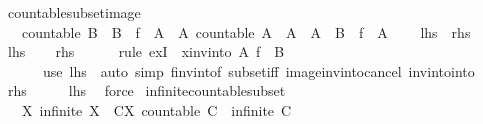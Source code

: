 \begin{isabellebody}
{\isafolddocument}%
%
\isadelimdocument
%
\endisadelimdocument
{}\isamarkupfalse%
\ countable{\isacharunderscore}subset{\isacharunderscore}image{\isacharcolon}\isanewline
\ \ \ {\isachardoublequoteopen}countable\ B\ {\isasymand}\ B\ {\isasymsubseteq}\ {\isacharparenleft}f\ {\isacharbackquote}\ A{\isacharparenright}\ {\isasymlongleftrightarrow}\ {\isacharparenleft}{\isasymexists}A{\isacharprime}{\isachardot}\ countable\ A{\isacharprime}\ {\isasymand}\ A{\isacharprime}\ {\isasymsubseteq}\ A\ {\isasymand}\ {\isacharparenleft}B\ {\isacharequal}\ f\ {\isacharbackquote}\ A{\isacharprime}{\isacharparenright}{\isacharparenright}{\isachardoublequoteclose}\isanewline
\ \ \ {\isacharparenleft}\ {\isachardoublequoteopen}{\isacharquery}lhs\ {\isacharequal}\ {\isacharquery}rhs{\isachardoublequoteclose}{\isacharparenright}\isanewline
%
\isadelimproof
%
\endisadelimproof
%
\isatagproof
{}\isamarkupfalse%
\isanewline
\ \ \isamarkupfalse%
\ {\isacharquery}lhs\isanewline
\ \ \isamarkupfalse%
\ {\isacharquery}rhs\isanewline
\ \ \ \ \isamarkupfalse%
\ {\isacharparenleft}rule\ exI\ {\isacharbrackleft}\ x{\isacharequal}{\isachardoublequoteopen}inv{\isacharunderscore}into\ A\ f\ {\isacharbackquote}\ B{\isachardoublequoteclose}{\isacharbrackright}{\isacharparenright}\isanewline
\ \ \ \ \ \ {\isacharparenleft}use\ {\isacartoucheopen}{\isacharquery}lhs{\isacartoucheclose}\ \ {\isacartoucheopen}auto\ simp{\isacharcolon}\ f{\isacharunderscore}inv{\isacharunderscore}into{\isacharunderscore}f\ subset{\isacharunderscore}iff\ image{\isacharunderscore}inv{\isacharunderscore}into{\isacharunderscore}cancel\ inv{\isacharunderscore}into{\isacharunderscore}into{\isacartoucheclose}{\isacharparenright}\isanewline
{}\isamarkupfalse%
\isanewline
\ \ \isamarkupfalse%
\ {\isacharquery}rhs\isanewline
\ \ \isamarkupfalse%
\ \isamarkupfalse%
\ {\isacharquery}lhs\ \isamarkupfalse%
\ force\isanewline
{}\isamarkupfalse%
%
\endisatagproof
{\isafoldproof}%
%
\isadelimproof
\isanewline
%
\endisadelimproof
\isanewline
{}\isamarkupfalse%
\ infinite{\isacharunderscore}countable{\isacharunderscore}subset{\isacharprime}{\isacharcolon}\isanewline
\ \ \ X{\isacharcolon}\ {\isachardoublequoteopen}infinite\ X{\isachardoublequoteclose}\ \ {\isachardoublequoteopen}{\isasymexists}C{\isasymsubseteq}X{\isachardot}\ countable\ C\ {\isasymand}\ infinite\ C{\isachardoublequoteclose}\isanewline

\end{isabellebody}
